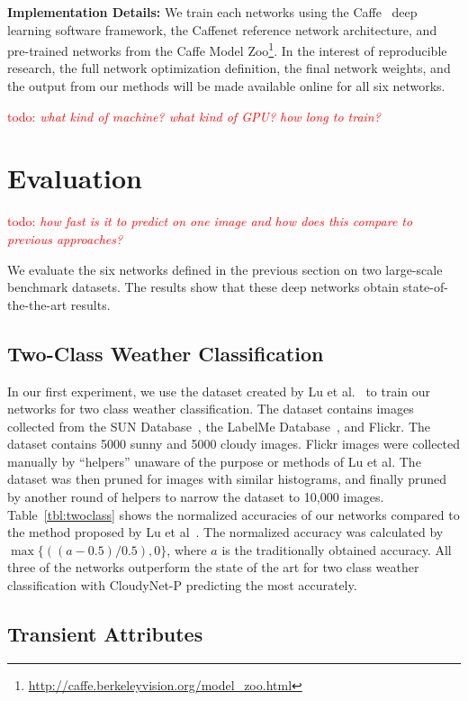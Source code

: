 \documentclass{article}
\newcommand{\todo}[1]{\textcolor{red}{todo: {\em #1}}}
\newcommand{\tblref}[1]{Table~\ref{tbl:#1}}
\begin{document}
\textbf{Implementation Details:} We train each networks using the
Caffe~\cite{caffe14} deep learning software framework, the Caffenet
reference network architecture, and pre-trained networks from the
Caffe Model
Zoo\footnote{\url{http://caffe.berkeleyvision.org/model_zoo.html}}.
In the interest of reproducible research, the full network
optimization definition, the final network weights, and the output
from our methods will be made available online for all six networks.

\todo{what kind of machine? what kind of GPU? how long to train?}

\section{Evaluation}

\todo{how fast is it to predict on one image and how does this compare
to previous approaches?}

We evaluate the six networks defined in the previous section on two
large-scale benchmark datasets. The results show that these deep
networks obtain state-of-the-the-art results. 

\subsection{Two-Class Weather Classification}

In our first experiment, we use the dataset created by Lu et al.~\cite{lutwoclass} to train
our networks for two class weather classification.  The dataset
contains images collected from the SUN Database~\cite{xiaoSUN}, the
LabelMe Database~\cite{russell2008labelme}, and Flickr. The dataset
contains 5000 sunny and 5000 cloudy images. Flickr images were
collected manually by ``helpers'' unaware of the purpose or methods of
Lu et al. The dataset was then pruned for images with similar
histograms, and finally pruned by another round of helpers to narrow
the dataset to 10,000 images.  \tblref{twoclass} shows the normalized
accuracies of our networks compared to the method proposed by
Lu et al~\cite{lutwoclass}.  The normalized accuracy was calculated by
$ \max\{((a - 0.5) / 0.5), 0\} $, where $a$ is the traditionally
obtained accuracy. All three of the networks outperform the state of
the art for two class weather classification with CloudyNet-P
predicting the most accurately.

\subsection{Transient Attributes}
\end{document}
